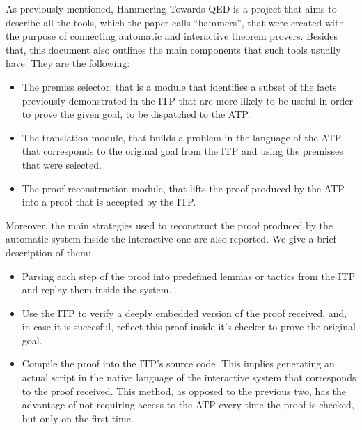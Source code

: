 As previously mentioned, Hammering Towards QED is a project
that aims to describe all the tools, which the paper calls ``hammers'',
that were created with the purpose of connecting automatic and interactive
theorem provers. Besides that, this document also outlines
the main components that such tools usually have. They are
the following:

\begin{itemize}
  \item The premiss selector, that is a module that identifies
        a subset of the facts previously demonstrated in the
        ITP that are more likely to be useful in order to
        prove the given goal, to be dispatched to the ATP.\@
  \item The translation module, that builds a problem in the language of the
        ATP that corresponds to the original goal from the ITP and using
        the premisses that were selected.\@
  \item The proof reconstruction module, that lifts the proof produced
        by the ATP into a proof that is accepted by the ITP.\@
\end{itemize}

Moreover, the main strategies used to reconstruct the proof produced
by the automatic system inside the interactive one are also reported.
We give a brief description of them:

\begin{itemize}
  \item Parsing each step of the proof into predefined lemmas or tactics
        from the ITP and replay them inside the system.
  \item Use the ITP to verify a deeply embedded version of the proof received,
        and, in case it is succesful, reflect this proof inside it's checker
        to prove the original goal.
  \item Compile the proof into the ITP's source code. This implies generating
        an actual script in the native language of the interactive system
        that corresponds to the proof received. This method, as opposed
        to the previous two, has the advantage of not requiring access to
        the ATP every time the proof is checked, but only on the first time.

\end{itemize}


